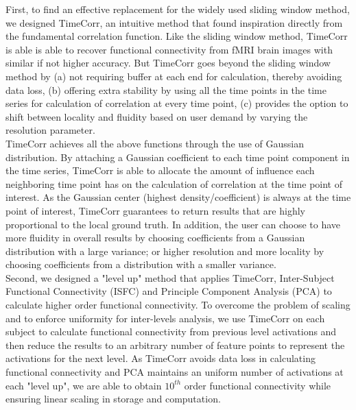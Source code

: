 \documentclass[12pt]{article}
\begin{document}
First, to find an effective replacement for the widely used sliding window method, we designed TimeCorr, an intuitive method that found inspiration directly from the fundamental correlation function. Like the sliding window method, TimeCorr is able is able to recover functional connectivity from fMRI brain images with similar if not higher accuracy. But TimeCorr goes beyond the sliding window method by (a) not requiring buffer at each end for calculation, thereby avoiding data loss, (b) offering extra stability by using all the time points in the time series for calculation of correlation at every time point, (c) provides the option to shift between locality and fluidity based on user demand by varying the resolution parameter.\\

TimeCorr achieves all the above functions through the use of Gaussian distribution. By attaching a Gaussian coefficient to each time point component in the time series, TimeCorr is able to allocate the amount of influence each neighboring time point has on the calculation of correlation at the time point of interest. As the Gaussian center (highest density/coefficient) is always at the time point of interest, TimeCorr guarantees to return results that are highly proportional to the local ground truth. In addition, the user can choose to have more fluidity in overall results by choosing coefficients from a Gaussian distribution with a large variance; or higher resolution and more locality by choosing coefficients from a distribution with a smaller variance.\\

Second, we designed a "level up" method that applies TimeCorr, Inter-Subject Functional Connectivity (ISFC) and Principle Component Analysis (PCA) to calculate higher order functional connectivity. To overcome the problem of scaling and to enforce uniformity for inter-levels analysis, we use TimeCorr on each subject to calculate functional connectivity from previous level activations and then reduce the results to an arbitrary number of feature points to represent the activations for the next level. As TimeCorr avoids data loss in calculating functional connectivity and PCA maintains an uniform number of activations at each "level up", we are able to obtain $10^{th}$ order functional connectivity while ensuring linear scaling in storage and computation.\\
\end{document}
